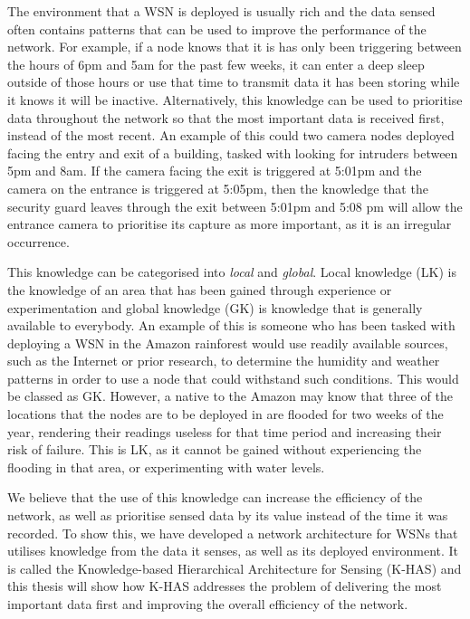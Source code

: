 The environment that a WSN is deployed is usually rich and the data sensed often contains patterns that can be used to improve the performance of the network. For example, if a node knows that it is has only been triggering between the hours of 6pm and 5am for the past few weeks, it can enter a deep sleep outside of those hours or use that time to transmit data it has been storing while it knows it will be inactive. Alternatively, this knowledge can be used to prioritise data throughout the network so that the most important data is received first, instead of the most recent. An example of this could two camera nodes deployed facing the entry and exit of a building, tasked with looking for intruders between 5pm and 8am. If the camera facing the exit is triggered at 5:01pm and the camera on the entrance is triggered at 5:05pm, then the knowledge that the security guard leaves through the exit between 5:01pm and 5:08 pm will allow the entrance camera to prioritise its capture as more important, as it is an irregular occurrence.

This knowledge can be categorised into \textit{local} and \textit{global}. Local knowledge (LK)  is the knowledge of an area that has been gained through experience or experimentation and global knowledge (GK) is knowledge that is generally available to everybody. An example of this is someone who has been tasked with deploying a WSN in the Amazon rainforest would use readily available sources, such as the Internet or prior research, to determine the humidity and weather patterns in order to use a node that could withstand such conditions. This would be classed as GK. However, a native to the Amazon may know that three of the locations that the nodes are to be deployed in are flooded for two weeks of the year, rendering their readings useless for that time period and increasing their risk of failure. This is LK, as it cannot be gained without experiencing the flooding in that area, or experimenting with water levels.

We believe that the use of this knowledge can increase the efficiency of the network, as well as prioritise sensed data by its value instead of the time it was recorded. To show this, we have developed a network architecture for WSNs that utilises knowledge from the data it senses, as well as its deployed environment. It is called the Knowledge-based Hierarchical Architecture for Sensing (K-HAS)  and this thesis will show how K-HAS addresses the problem of delivering the most important data first and improving the overall efficiency of the network.

